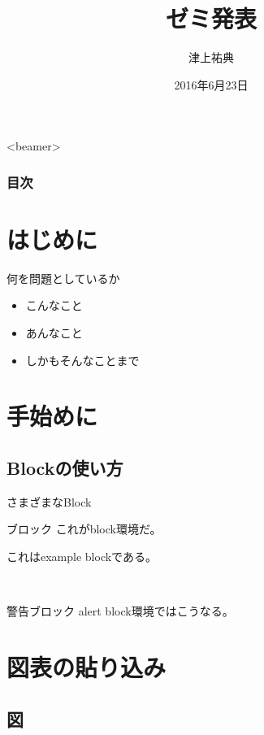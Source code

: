 \documentclass[dvipdfmx]{beamer}
\title[Slides with Beamer]{ゼミ発表}
\institute{西田研究室}
\author[Hanako Daito]{津上祐典}
\date[June 12 2013]{2016年6月23日}
\begin{document}
\begin{frame}
 \titlepage 
\end{frame}

\begin{frame}<beamer> 
  \frametitle{目次}
  \tableofcontents
\end{frame}

\section{はじめに} %
\begin{frame}{何を問題としているか} %
 \begin{itemize}
  \item こんなこと
  \item あんなこと
  \item しかも\alert{そんなことまで}
 \end{itemize}
\end{frame} 

\section{手始めに}

\subsection{Blockの使い方}
\begin{frame}{さまざまなBlock}
\begin{block}{ブロック} 
これがblock環境だ。
\end{block}
\begin{example}
これはexample blockである。
\end{example}

\pause　%
\begin{alertblock}{警告ブロック}
alert block環境ではこうなる。
\end{alertblock}
\end{frame}



\section{図表の貼り込み}

\subsection{図}
\end{document}
